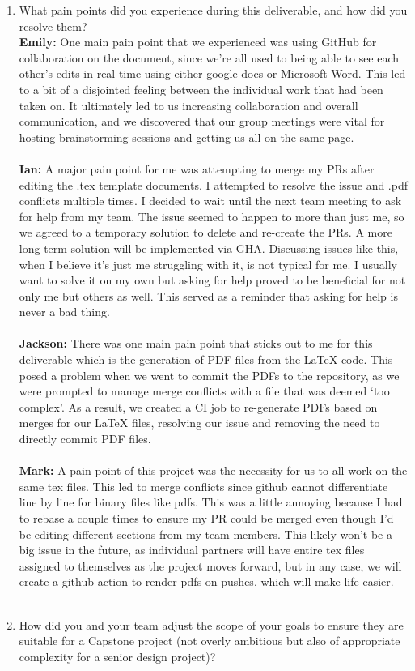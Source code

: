 \documentclass{article}
\begin{document}
\begin{enumerate}
    \item What pain points did you experience during this deliverable, and how
    did you resolve them?\\
    \textbf{Emily:} One main pain point that we experienced was using GitHub for collaboration on the document, since we’re all used to being able to see each 
                    other’s edits in real time using either google docs or Microsoft Word. This led to a bit of a disjointed feeling between the individual work 
                    that had been taken on. It ultimately led to us increasing collaboration and overall communication, and we discovered that our group meetings 
                    were vital for hosting brainstorming sessions and getting us all on the same page. \\ \\
    \textbf{Ian:} A major pain point for me was attempting to merge my PRs after editing the .tex template documents. I attempted to resolve the issue and .pdf conflicts multiple times. 
                  I decided to wait until the next team meeting to ask for help from my team. The issue seemed to happen to more than just me, so we agreed to a temporary solution to delete and re-create 
                  the PRs. A more long term solution will be implemented via GHA. Discussing issues like this, when I believe it’s just me struggling with it, is not typical for me. I usually want to solve 
                  it on my own but asking for help proved to be beneficial for not only me but others as well. This served as a reminder that asking for help is never a bad thing.\\ \\
    \textbf{Jackson:} There was one main pain point that sticks out to me for this deliverable which is the generation of PDF files from the LaTeX code. This posed 
                    a problem when we went to commit the PDFs to the repository, as we were prompted to manage merge conflicts with a file that was deemed ‘too complex’. As a result, 
                    we created a CI job to re-generate PDFs based on merges for our LaTeX files, resolving our issue and removing the need to directly commit PDF files.\\ \\
    \textbf{Mark:} A pain point of this project was the necessity for us to all work on the same tex files. This led to merge conflicts since github cannot differentiate line by line for binary files like pdfs. 
                   This was a little annoying because I had to rebase a couple times to ensure my PR could be merged even though I’d be editing different sections from my team members. 
                   This likely won’t be a big issue in the future, as individual partners will have entire tex files assigned to themselves as the project moves forward, but in any case, 
                   we will create a github action to render pdfs on pushes, which will make life easier.\\ \\

    \item How did you and your team adjust the scope of your goals to ensure
    they are suitable for a Capstone project (not overly ambitious but also of
    appropriate complexity for a senior design project)?
\end{enumerate}  
\end{document}
